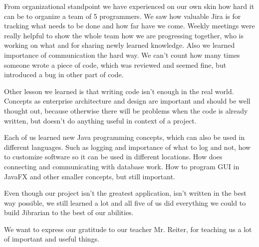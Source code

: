 \documentclass[11pt,twoside,a4paper]{article}
\begin{document}
From organizational standpoint we have experienced on our own skin how hard it
can be to organize a team of 5 programmers. We saw how valuable Jira is for
tracking what needs to be done and how far have we come. Weekly meetings were
really helpful to show the whole team how we are progressing together, who is
working on what and for sharing newly learned knowledge. Also we learned
importance of communication the hard way. We can't count how many times someone
wrote a piece of code, which was reviewed and seemed fine, but introduced
a bug in other part of code.

Other lesson we learned is that writing code isn't enough in the real world.
Concepts as enterprise architecture and design are important and should be well
thought out, because otherwise there will be problems when the code is already
written, but doesn't do anything useful in context of a project.

Each of us learned new Java programming concepts, which can also be used in
different languages. Such as logging and importance of what to log and not,
how to customize software so it can be used in different locations. How does
connecting and communicating with database work. How to program GUI in JavaFX
and other smaller concepts, but still important.

Even though our project isn't the greatest application, isn't written in
the best way possible, we still learned a lot and all five of us did everything
we could to build Jibrarian to the best of our abilities.

We want to express our gratitude to our teacher Mr. Reiter, for teaching us a lot
of important and useful things.



\end{document}
